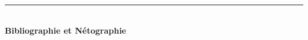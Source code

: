 \clearpage
\pagestyle{empty}
\thispagestyle{empty}
\markboth{}{}
\markright{}
\makeatletter
\let\ps@plain\ps@empty
\makeatother
{}
{}
\renewcommand{\bibname}{}

\begin{center}
  \rule{\linewidth}{1.5pt}\\[0.6cm]
  {\fontsize{20}{24}\selectfont \textbf{Bibliographie et Nétographie}}
\end{center}

\vspace{0.8cm}

\patchcmd{\thebibliography}{\chapter*{\bibname}}{}{}{}

